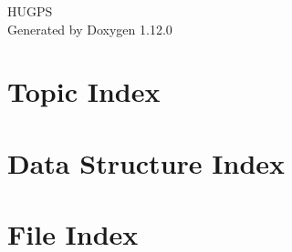 \documentclass[twoside]{book}
\newcommand{\+}{\discretionary{\mbox{\scriptsize$\hookleftarrow$}}{}{}}
\newcommand{\clearemptydoublepage}{%
    \newpage{\pagestyle{empty}\cleardoublepage}%
  }
\begin{document}
  \raggedbottom
    \hypersetup{pageanchor=false,
                bookmarksnumbered=true,
                pdfencoding=unicode
               }
  \begin{titlepage}
  \vspace*{7cm}
  \begin{center}%
  {\Large HUGPS}\\
  \vspace*{1cm}
  {\large Generated by Doxygen 1.12.0}\\
  \end{center}
  \end{titlepage}
  \clearemptydoublepage
  \tableofcontents
  \clearemptydoublepage
  \hypersetup{pageanchor=true}





\chapter{Topic Index}

\chapter{Data Structure Index}

\chapter{File Index}

\end{document}
